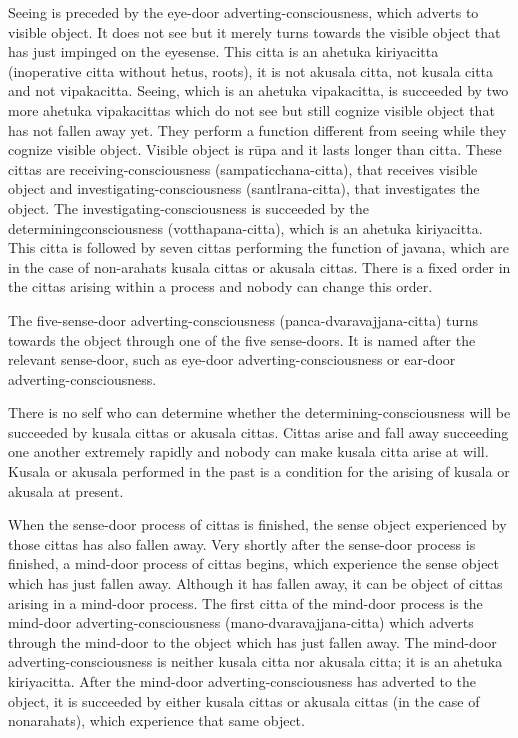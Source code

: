Seeing is preceded by the eye-door adverting-consciousness, which adverts to 
visible object. It does not see but it merely turns towards the visible object that 
has just impinged on the eyesense. This citta is an ahetuka kiriyacitta (inoperative citta without hetus, roots), it is not akusala citta, not kusala citta and not 
vipakacitta. Seeing, which is an ahetuka vipakacitta, is succeeded by two more 
ahetuka vipakacittas which do not see but still cognize visible object that has 
not fallen away yet. They perform a function different from seeing while they 
cognize visible object. Visible object is rūpa and it lasts longer than citta. These 
cittas are receiving-consciousness (sampaticchana-citta), that receives visible 
object and investigating-consciousness (santlrana-citta), that investigates the object. The investigating-consciousness is succeeded by the determiningconsciousness (votthapana-citta), which is an ahetuka kiriyacitta. This citta is 
followed by seven cittas performing the function of javana, which are in the 
case of non-arahats kusala cittas or akusala cittas. There is a fixed order in the 
cittas arising within a process and nobody can change this order. 

The five-sense-door adverting-consciousness (panca-dvaravajjana-citta) turns towards the 
object through one of the five sense-doors. It is named after the relevant sense-door, such as 
eye-door adverting-consciousness or ear-door adverting-consciousness. 

There is no self who can determine whether the determining-conscious\-ness will 
be succeeded by kusala cittas or akusala cittas. Cittas arise and fall away succeeding one another extremely rapidly and nobody can make kusala citta arise 
at will. Kusala or akusala performed in the past is a condition for the arising of 
kusala or akusala at present. 

When the sense-door process of cittas is finished, the sense object experienced 
by those cittas has also fallen away. Very shortly after the sense-door process is 
finished, a mind-door process of cittas begins, which experience the sense object which has just fallen away. Although it has fallen away, it can be object of 
cittas arising in a mind-door process. The first citta of the mind-door process is 
the mind-door adverting-consciousness (mano-dvaravajjana-citta) which adverts 
through the mind-door to the object which has just fallen away. The mind-door 
adverting-consciousness is neither kusala citta nor akusala citta; it is an ahetuka 
kiriyacitta. After the mind-door adverting-conscious\-ness has adverted to the object, it is succeeded by either kusala cittas or akusala cittas (in the case of nonarahats), which experience that same object. 

